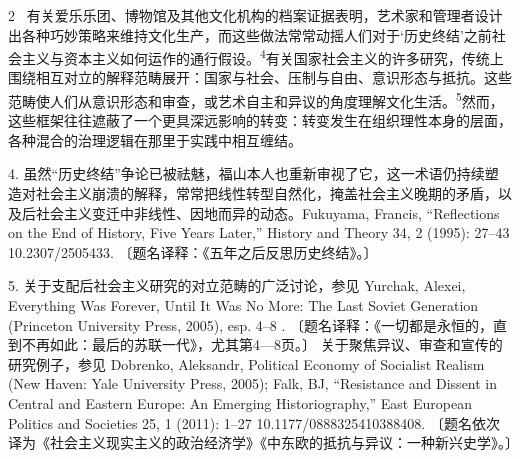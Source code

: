 \documentclass[10pt,a4paper]{article}
\begin{document}
\begin{paracol}{2}
\switchcolumn*
{\scriptsize\color{gray} [p. 2]}\ 有关爱乐乐团、博物馆及其他文化机构的档案证据表明，艺术家和管理者设计出各种巧妙策略来维持文化生产，而这些做法常常动摇人们对于‘历史终结’之前社会主义与资本主义如何运作的通行假\mbox{设。\textsuperscript{4}}有关国家社会主义的许多研究，传统上围绕相互对立的解释范畴展开：国家与社会、压制与自由、意识形态与抵抗。这些范畴使人们从意识形态和审查，或艺术自主和异议的角度理解文化生\mbox{活。\textsuperscript{5}}然而，这些框架往往遮蔽了一个更具深远影响的转变：转变发生在组织理性本身的层面，各种混合的治理逻辑在那里于实践中相互缠结。\par{\small 4. 虽然“历史终结”争论已被祛魅，福山本人也重新审视了它，这一术语仍持续塑造对社会主义崩溃的解释，常常把线性转型自然化，掩盖社会主义晚期的矛盾，以及后社会主义变迁中非线性、因地而异的动态。Fukuyama, Francis, “Reflections on the End of History, Five Years Later,” History and Theory 34, 2 (1995): 27–43 10.2307/2505433. 〔题名译释：《五年之后反思历史终结》。〕\par}{\small 5. 关于支配后社会主义研究的对立范畴的广泛讨论，参见 Yurchak, Alexei, Everything Was Forever, Until It Was No More: The Last Soviet Generation (Princeton University Press, 2005), esp. 4–8 .  〔题名译释：《一切都是永恒的，直到不再如此：最后的苏联一代》，尤其第4—8页。〕 关于聚焦异议、审查和宣传的研究例子，参见 Dobrenko, Aleksandr, Political Economy of Socialist Realism (New Haven: Yale University Press, 2005); Falk, BJ, “Resistance and Dissent in Central and Eastern Europe: An Emerging Historiography,” East European Politics and Societies 25, 1 (2011): 1–27 10.1177/0888325410388408. 〔题名依次译为《社会主义现实主义的政治经济学》《中东欧的抵抗与异议：一种新兴史学》。〕\par}
\switchcolumn

\end{paracol}
\end{document}
